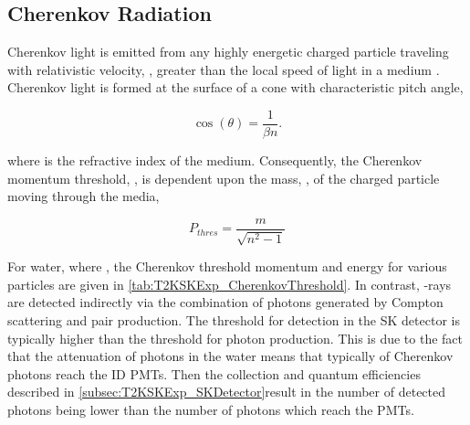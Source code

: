 \subsection{Cherenkov Radiation}
\label{subsec:T2KSKExp_Cherenkov}

Cherenkov light is emitted from any highly energetic charged particle traveling with relativistic velocity, \quickmath{\beta}, greater than the local speed of light in a medium \cite{Cerenkov1937-tl}.
Cherenkov light is formed at the surface of a cone with characteristic pitch angle,

\begin{equation}
  \label{eq:T2KSKExp_CherenkovConeAngle}
  \cos(\theta)=\frac{1}{\beta n}.
\end{equation}

where  is the refractive index of the medium. Consequently, the Cherenkov momentum threshold, , is dependent upon the mass, , of the charged particle moving through the media,

\begin{equation}
  P_{thres} = \frac{m}{\sqrt{n^{2}-1}}
\end{equation}

For water, where , the Cherenkov threshold momentum and energy for various particles are given in \autoref{tab:T2KSKExp_CherenkovThreshold}. In contrast, \quickmath{\gamma}-rays are detected indirectly via the combination of photons generated by Compton scattering and pair production. The threshold for detection in the SK detector is typically higher than the threshold for photon production. This is due to the fact that the attenuation of photons in the water means that typically  of Cherenkov photons reach the ID PMTs. Then the collection and quantum efficiencies described in \autoref{subsec:T2KSKExp_SKDetector}result in the number of detected photons being lower than the number of photons which reach the PMTs. 

